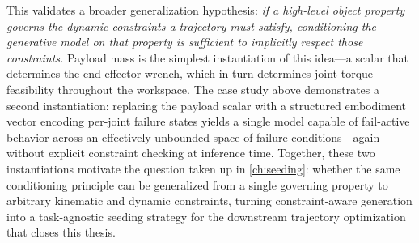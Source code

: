 This validates a broader generalization hypothesis: \textit{if a high-level object property governs the dynamic constraints a trajectory must satisfy, conditioning the generative model on that property is sufficient to implicitly respect those constraints.}
Payload mass is the simplest instantiation of this idea---a scalar that determines the end-effector wrench, which in turn determines joint torque feasibility throughout the workspace.
The case study above demonstrates a second instantiation: replacing the payload scalar with a structured embodiment vector encoding per-joint failure states yields a single model capable of fail-active behavior across an effectively unbounded space of failure conditions---again without explicit constraint checking at inference time.
Together, these two instantiations motivate the question taken up in \cref{ch:seeding}: whether the same conditioning principle can be generalized from a single governing property to arbitrary kinematic and dynamic constraints, turning constraint-aware generation into a task-agnostic seeding strategy for the downstream trajectory optimization that closes this thesis.
